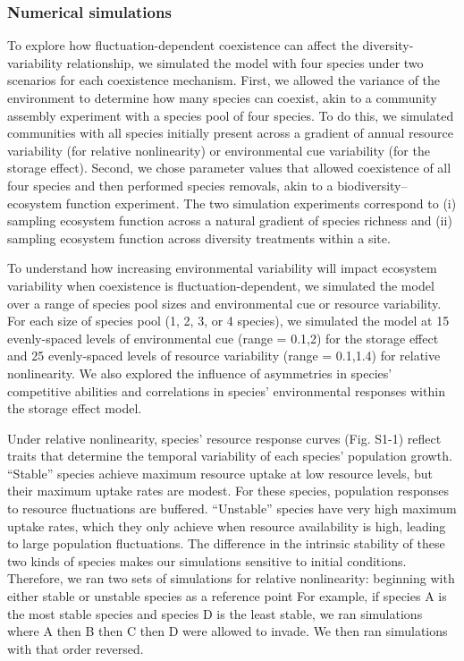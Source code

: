 \documentclass[12pt,]{article}
\begin{document}
\subsubsection{Numerical simulations}\label{numerical-simulations}

To explore how fluctuation-dependent coexistence can affect the
diversity-variability relationship, we simulated the model with four
species under two scenarios for each coexistence mechanism. First, we
allowed the variance of the environment to determine how many species
can coexist, akin to a community assembly experiment with a species pool
of four species. To do this, we simulated communities with all species
initially present across a gradient of annual resource variability (for
relative nonlinearity) or environmental cue variability (for the storage
effect). Second, we chose parameter values that allowed coexistence of
all four species and then performed species removals, akin to a
biodiversity--ecosystem function experiment. The two simulation
experiments correspond to (i) sampling ecosystem function across a
natural gradient of species richness and (ii) sampling ecosystem
function across diversity treatments within a site.

To understand how increasing environmental variability will impact
ecosystem variability when coexistence is fluctuation-dependent, we
simulated the model over a range of species pool sizes and environmental
cue or resource variability. For each size of species pool (1, 2, 3, or
4 species), we simulated the model at 15 evenly-spaced levels of
environmental cue (range = 0.1,2) for the storage effect and 25
evenly-spaced levels of resource variability (range = 0.1,1.4) for
relative nonlinearity. We also explored the influence of asymmetries in
species' competitive abilities and correlations in species'
environmental responses within the storage effect model.

Under relative nonlinearity, species' resource response curves (Fig.
S1-1) reflect traits that determine the temporal variability of each
species' population growth. ``Stable'' species achieve maximum resource
uptake at low resource levels, but their maximum uptake rates are
modest. For these species, population responses to resource fluctuations
are buffered. ``Unstable'' species have very high maximum uptake rates,
which they only achieve when resource availability is high, leading to
large population fluctuations. The difference in the intrinsic stability
of these two kinds of species makes our simulations sensitive to initial
conditions. Therefore, we ran two sets of simulations for relative
nonlinearity: beginning with either stable or unstable species as a
reference point For example, if species A is the most stable species and
species D is the least stable, we ran simulations where A then B then C
then D were allowed to invade. We then ran simulations with that order
reversed.
\end{document}
